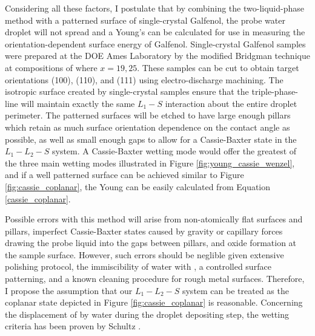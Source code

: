 Considering all these factors, I postulate that by combining the two-liquid-phase method with a patterned surface of single-crystal Galfenol, the probe water droplet will not spread and a Young's \ca can be calculated for use in measuring the orientation-dependent surface energy of Galfenol. Single-crystal Galfenol samples were prepared at the DOE Ames Laboratory by the modified Bridgman technique at compositions of \fegacomp where $x=19,25$. These samples can be cut to obtain target orientations \hkl(100), \hkl(110), and \hkl(111) using electro-discharge machining. The isotropic surface created by single-crystal samples ensure that the triple-phase-line will maintain exactly the same $L_1-S$ interaction about the entire droplet perimeter. The patterned surfaces will be etched to have large enough pillars which retain as much surface orientation dependence on the contact angle as possible, as well as small enough gaps to allow for a Cassie-Baxter state in the $ L_1-L_2-S $ system. A Cassie-Baxter wetting mode would offer the greatest \ca of the three main wetting modes illustrated in Figure \ref{fig:young_cassie_wenzel}, and if a well patterned surface can be achieved similar to Figure \ref{fig:cassie_coplanar}, the Young \ca can be easily calculated from Equation \ref{cassie_coplanar}. 

Possible errors with this method will arise from non-atomically flat surfaces and pillars, imperfect Cassie-Baxter states caused by gravity or capillary forces drawing the probe liquid into the gaps between pillars, and oxide formation at the sample surface. However, such errors should be neglible given extensive polishing protocol, the immiscibility of water with \nalk[s], a controlled surface patterning, and a known cleaning procedure for rough metal surfaces. Therefore, I propose the assumption that our $ L_1-L_2-S $ system can be treated as the coplanar state depicted in Figure \ref{fig:cassie_coplanar} is reasonable. Concerning the displacement of \nalk[s] by water during the droplet depositing step, the wetting criteria has been proven by Schultz \etal\cite{Schultz1992,Giljean2011}. 


